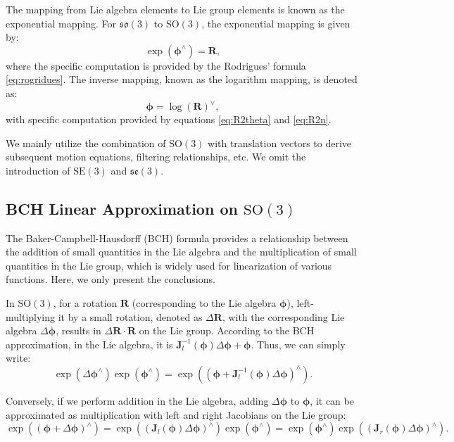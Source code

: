 The mapping from Lie algebra elements to Lie group elements is known as the exponential mapping. For $\mathfrak{so}(3)$ to $\mathrm{SO}(3)$, the exponential mapping is given by:
\begin{equation}\label{key}
	\exp(\boldsymbol{\phi}^\wedge) = \mathbf{R},
\end{equation}
where the specific computation is provided by the Rodrigues' formula \eqref{eq:rogridues}. The inverse mapping, known as the logarithm mapping, is denoted as:
\begin{equation}\label{key}
	\boldsymbol{\phi} = \log(\mathbf{R})^\vee,
\end{equation}
with specific computation provided by equations \eqref{eq:R2theta} and \eqref{eq:R2n}.

We mainly utilize the combination of $\mathrm{SO}(3)$ with translation vectors to derive subsequent motion equations, filtering relationships, etc. We omit the introduction of $\mathrm{SE}(3)$ and $\mathfrak{se}(3)$.

\subsection{BCH Linear Approximation on $\mathrm{SO}(3)$}
The Baker-Campbell-Hausdorff (BCH) formula \cite{gilmore1974baker} provides a relationship between the addition of small quantities in the Lie algebra and the multiplication of small quantities in the Lie group, which is widely used for linearization of various functions. Here, we only present the conclusions.

In $\mathrm{SO}(3)$, for a rotation $\mathbf{R}$ (corresponding to the Lie algebra $\boldsymbol{\phi}$), left-multiplying it by a small rotation, denoted as $\Delta \mathbf{R}$, with the corresponding Lie algebra $\Delta \boldsymbol{\phi}$, results in $ \Delta \mathbf{R} \cdot \mathbf{R}$ on the Lie group. According to the BCH approximation, in the Lie algebra, it is $\mathbf{J}_l^{-1} (\boldsymbol{\phi}) \Delta \boldsymbol{\phi} + \boldsymbol{\phi}$. Thus, we can simply write:
\begin{equation}
	\exp \left( {\Delta { \boldsymbol{\phi} ^ \wedge }} \right)\exp \left( {{ \boldsymbol{\phi} ^ \wedge }} 
	\right) = \exp \left( {{{\left( { \boldsymbol{\phi}  + \mathbf{J}_l^{ - 1}\left( \boldsymbol{\phi}  \right)\Delta 
					\boldsymbol{\phi} } \right)}^ \wedge }} \right).
\end{equation}

Conversely, if we perform addition in the Lie algebra, adding $\Delta \boldsymbol{\phi}$ to $\boldsymbol{\phi}$, it can be approximated as multiplication with left and right Jacobians on the Lie group:
\begin{equation}
	\exp \left( {{{\left( { \boldsymbol{\phi}  + \Delta \boldsymbol{\phi} } \right)}^ \wedge }} \right) = \exp 
	\left( {{{\left( {{ \mathbf{J}_l} (\boldsymbol{\phi})\Delta \boldsymbol{\phi} } \right)}^ \wedge }} \right)\exp \left( {{ 
			\boldsymbol{\phi} ^ \wedge }} \right) = \exp \left( {{\boldsymbol{\phi} ^ \wedge }} \right)\exp \left( 
	{{{\left( {{\mathbf{J}_r}(\boldsymbol{\phi}) \Delta \boldsymbol{\phi} } \right)}^ \wedge }} \right).
\end{equation}

